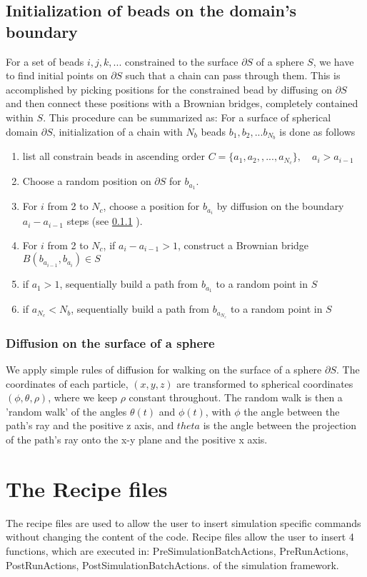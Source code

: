 \documentclass[12pt]{report}
\begin{document}
\subsection{Initialization of beads on the domain's boundary}
For a set of beads $ i,j,k,...$ constrained to the surface $\partial S$ of a sphere $S$, we have to find initial points on $\partial S$ such that a chain can pass through them. This is accomplished by picking positions for the constrained bead by diffusing on $\partial S$ and then connect these positions with a Brownian bridges, completely contained within $S$. This procedure can be summarized as: 
For a surface of spherical domain $\partial S$, initialization of a chain with $N_b$ beads $b_1,b_2,...b_{N_b}$ is done as follows
\begin{enumerate}
\item list all constrain beads in ascending order $C=\{a_1,a_2,,...,a_{N_c}\}, \quad a_i>a_{i-1}$
\item Choose a random position on $\partial S$ for $b_{a_1}$.
\item For $i$ from 2 to $N_c$, choose a position for $b_{a_i}$ by diffusion on the boundary $a_i -a_{i-1}$ steps (see \ref{subsubSec_diffusionOntheSurface} ).
\item For $i$ from 2 to $N_c$, if $a_{i}-a_{i-1} >1$, construct a Brownian bridge $B(b_{a_{i-1}},b_{a_i})\in S$ 
\item if $a_1>1$, sequentially build a path from $b_{a_1}$ to a random point in $S$
\item if $a_{N_c}<N_b$, sequentially build a path from $b_{a_{N_c}}$ to a random point in $S$ 
\end{enumerate}

\subsubsection{Diffusion on the surface of a sphere}\label{subsubSec_diffusionOntheSurface}
We apply simple rules of diffusion for walking on the surface of a sphere $\partial S$. The coordinates of each particle, $(x,y,z)$ are transformed to spherical coordinates $(\phi,\theta,\rho)$, where we keep $\rho$ constant throughout. The random walk is then a 'random walk' of the angles $\theta(t)$ and $\phi(t)$, with $\phi$ the angle between the path's ray and the positive z axis, and $theta$ is the angle between the projection of the path's ray onto the x-y plane and the positive x axis. 

\section{The Recipe files}
The recipe files are used to allow the user to insert simulation specific commands without changing the content of the code. Recipe files allow the user to insert 4 functions, which are executed in: PreSimulationBatchActions, PreRunActions, PostRunActions, PostSimulationBatchActions. of the simulation framework. 
\end{document}
